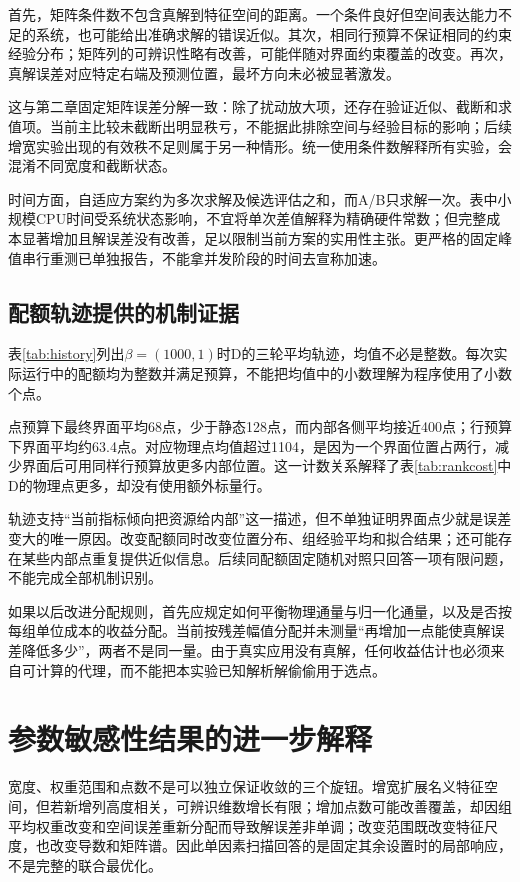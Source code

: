首先，矩阵条件数不包含真解到特征空间的距离。一个条件良好但空间表达能力不足的系统，也可能给出准确求解的错误近似。其次，相同行预算不保证相同的约束经验分布；矩阵列的可辨识性略有改善，可能伴随对界面约束覆盖的改变。再次，真解误差对应特定右端及预测位置，最坏方向未必被显著激发。

这与第二章固定矩阵误差分解一致：除了扰动放大项，还存在验证近似、截断和求值项。当前主比较未截断出明显秩亏，不能据此排除空间与经验目标的影响；后续增宽实验出现的有效秩不足则属于另一种情形。统一使用条件数解释所有实验，会混淆不同宽度和截断状态。

时间方面，自适应方案约为多次求解及候选评估之和，而A/B只求解一次。表中小规模CPU时间受系统状态影响，不宜将单次差值解释为精确硬件常数；但完整成本显著增加且解误差没有改善，足以限制当前方案的实用性主张。更严格的固定峰值串行重测已单独报告，不能拿并发阶段的时间去宣称加速。

\subsection{配额轨迹提供的机制证据}
表\ref{tab:history}列出$\beta=(1000,1)$时D的三轮平均轨迹，均值不必是整数。每次实际运行中的配额均为整数并满足预算，不能把均值中的小数理解为程序使用了小数个点。
\begin{table}[htbp]\centering
\caption{联合策略D的实际平均配额轨迹；每侧64特征、五种子}\label{tab:history}

\end{table}

点预算下最终界面平均68点，少于静态128点，而内部各侧平均接近400点；行预算下界面平均约63.4点。对应物理点均值超过1104，是因为一个界面位置占两行，减少界面后可用同样行预算放更多内部位置。这一计数关系解释了表\ref{tab:rankcost}中D的物理点更多，却没有使用额外标量行。

轨迹支持“当前指标倾向把资源给内部”这一描述，但不单独证明界面点少就是误差变大的唯一原因。改变配额同时改变位置分布、组经验平均和拟合结果；还可能存在某些内部点重复提供近似信息。后续同配额固定随机对照只回答一项有限问题，不能完成全部机制识别。

如果以后改进分配规则，首先应规定如何平衡物理通量与归一化通量，以及是否按每组单位成本的收益分配。当前按残差幅值分配并未测量“再增加一点能使真解误差降低多少”，两者不是同一量。由于真实应用没有真解，任何收益估计也必须来自可计算的代理，而不能把本实验已知解析解偷偷用于选点。

\section{参数敏感性结果的进一步解释}
宽度、权重范围和点数不是可以独立保证收敛的三个旋钮。增宽扩展名义特征空间，但若新增列高度相关，可辨识维数增长有限；增加点数可能改善覆盖，却因组平均权重改变和空间误差重新分配而导致解误差非单调；改变范围既改变特征尺度，也改变导数和矩阵谱。因此单因素扫描回答的是固定其余设置时的局部响应，不是完整的联合最优化。

